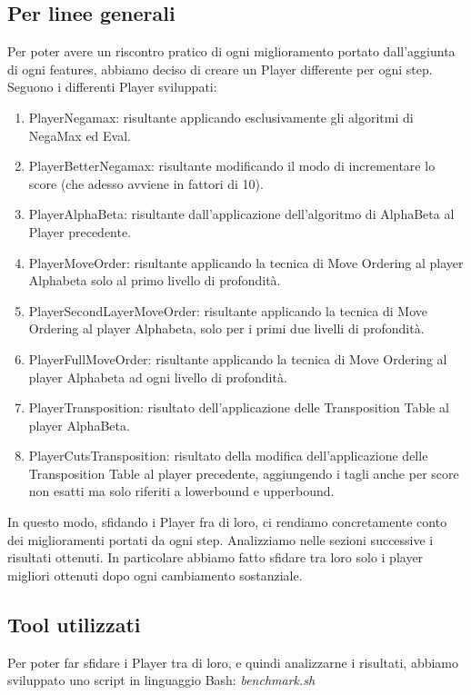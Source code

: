 \documentclass{article}
\begin{document}
\subsection{Per linee generali}
Per poter avere un riscontro pratico di ogni miglioramento portato dall'aggiunta di ogni features, abbiamo deciso di creare un Player differente per ogni step.
Seguono i differenti Player sviluppati:
\begin{enumerate}
    \item PlayerNegamax: risultante applicando esclusivamente gli algoritmi di NegaMax ed Eval.
    \item PlayerBetterNegamax: risultante modificando il modo di incrementare lo score (che adesso avviene in fattori di 10).
    \item PlayerAlphaBeta: risultante dall'applicazione dell'algoritmo di AlphaBeta al Player precedente.
    \item PlayerMoveOrder: risultante applicando la tecnica di Move Ordering al player Alphabeta solo al primo livello di profondità.
    \item PlayerSecondLayerMoveOrder: risultante applicando la tecnica di Move Ordering al player Alphabeta, solo per i primi due livelli di profondità.
    \item PlayerFullMoveOrder: risultante applicando la tecnica di Move Ordering al player Alphabeta ad ogni livello di profondità.
    \item PlayerTransposition: risultato dell'applicazione delle Transposition Table al player AlphaBeta.
    \item PlayerCutsTransposition: risultato della modifica dell'applicazione delle Transposition Table al player precedente, aggiungendo i tagli anche per score non esatti ma solo riferiti a lowerbound e upperbound.
\end{enumerate}
In questo modo, sfidando i Player fra di loro, ci rendiamo concretamente conto dei miglioramenti portati da ogni step. Analizziamo nelle sezioni successive i risultati ottenuti. 
In particolare abbiamo fatto sfidare tra loro solo i player migliori ottenuti dopo ogni cambiamento sostanziale.

\subsection{Tool utilizzati}
Per poter far sfidare i Player tra di loro, e quindi analizzarne i risultati, abbiamo sviluppato uno script in linguaggio Bash: \textit{benchmark.sh}
\end{document}
